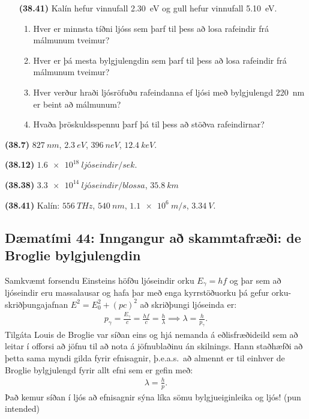 \begin{enumerate}[label = \textbf{(\alph*)}]
\item[\textbf{(38.41)}] Kalín hefur vinnufall \SI{2.30}{eV} og gull hefur vinnufall \SI{5.10}{eV}.
\begin{enumerate}[label = \textbf{(\alph*)}]
    \item Hver er minnsta tíðni ljóss sem þarf til þess að losa rafeindir frá málmunum tveimur?
    \item Hver er þá mesta bylgjulengdin sem þarf til þess að losa rafeindir frá málmunum tveimur?
    \item Hver verður hraði ljósröfuðu rafeindanna ef ljósi með bylgjulengd \SI{220}{nm} er beint að málmunum?
    \item Hvaða þröskuldsspennu þarf þá til þess að stöðva rafeindirnar?
\end{enumerate}

\end{enumerate}

\begin{tcolorbox}
\begin{enumerate*}[label = ]
  \item \textbf{(38.7)} $\SI{827}{nm}$, $\SI{2.3}{eV}$, $\SI{396}{neV}$, $\SI{12.4}{keV}$.
  \item \textbf{(38.12)} $\SI{1.6e18}{ljóseindir/sek}$. \\
  \item \textbf{(38.38)} $\SI{3.3e14}{ljóseindir/blossa}$, $\SI{35.8}{km}$
  \item \textbf{(38.41)} Kalín: $\SI{556}{THz}$, $\SI{540}{nm}$, $\SI{1.1e6}{m/s}$, $\SI{3.34}{V}$.
\end{enumerate*}
\end{tcolorbox}



\newpage

\subsection*{Dæmatími 44: Inngangur að skammtafræði: de Broglie bylgjulengdin}

\begin{tcolorbox}
Samkvæmt forsendu Einsteins höfðu ljóseindir orku $E_{\gamma} = hf$ og þar sem að ljóseindir eru massalausar og hafa þar með enga kyrrstöðuorku þá gefur orku-skriðþungajafnan $E^2 = E_0^2 + (pc)^2$ að skriðþungi ljóseinda er:
\begin{align*}
    p_\gamma = \frac{E_\gamma}{c} = \frac{hf}{c} = \frac{h}{\lambda} \implies \lambda = \frac{h}{p_\gamma}.
\end{align*}
Tilgáta Louis de Broglie var síðan eins og hjá nemanda á eðlisfræðideild sem að leitar í offorsi að jöfnu til að nota á jöfnublaðinu án skilnings. Hann staðhæfði að þetta sama myndi gilda fyrir efnisagnir, þ.e.a.s.~að almennt er til einhver de Broglie bylgjulengd fyrir allt efni sem er gefin með:
\begin{align*}
    \lambda = \frac{h}{p}.
\end{align*}
Það kemur síðan í ljós að efnisagnir sýna líka sömu bylgjueiginleika og ljós! (pun intended)
\end{tcolorbox}

